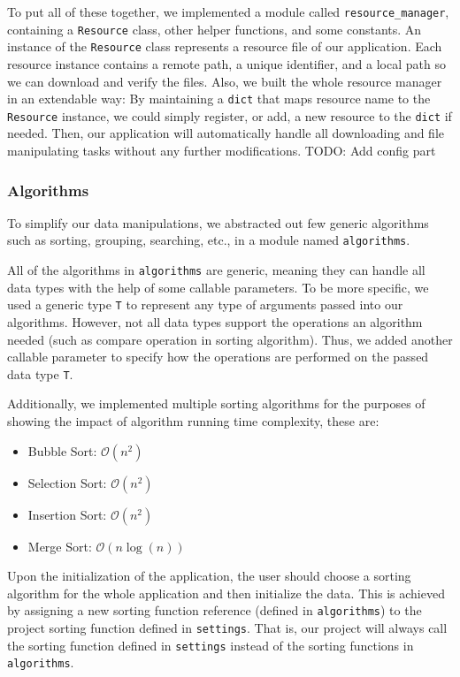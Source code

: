 \documentclass[fontsize=11pt]{article}
\newcommand{\bigO}{\mathcal{O}}
\begin{document}
    To put all of these together, we implemented a module called \verb|resource_manager|, containing a \verb|Resource| class, other helper functions, and some constants. An instance of the \verb|Resource| class represents a resource file of our application. Each resource instance contains a remote path, a unique identifier, and a local path so we can download and verify the files. Also, we built the whole resource manager in an extendable way: By maintaining a \verb|dict| that maps resource name to the \verb|Resource| instance, we could simply register, or add, a new resource to the \verb|dict| if needed. Then, our application will automatically handle all downloading and file manipulating tasks without any further modifications. TODO: Add config part

    \subsubsection{Algorithms}

    To simplify our data manipulations, we abstracted out few generic algorithms such as sorting, grouping, searching, etc., in a module named \verb|algorithms|.

    All of the algorithms in \verb|algorithms| are generic, meaning they can handle all data types with the help of some callable parameters. To be more specific, we used a generic type \verb|T| to represent any type of arguments passed into our algorithms. However, not all data types support the operations an algorithm needed (such as compare operation in sorting algorithm). Thus, we added another callable parameter to specify how the operations are performed on the passed data type \verb|T|.

    Additionally, we implemented multiple sorting algorithms for the purposes of showing the impact of algorithm running time complexity, these are:
    
    \begin{itemize}
        \item Bubble Sort: $\bigO(n^2)$
        \item Selection Sort: $\bigO(n^2)$
        \item Insertion Sort: $\bigO(n^2)$
        \item Merge Sort: $\bigO(n\log(n))$
    \end{itemize}

    Upon the initialization of the application, the user should choose a sorting algorithm for the whole application and then initialize the data. This is achieved by assigning a new sorting function reference (defined in \verb|algorithms|) to the project sorting function defined in \verb|settings|. That is, our project will always call the sorting function defined in \verb|settings| instead of the sorting functions in \verb|algorithms|.
\end{document}
